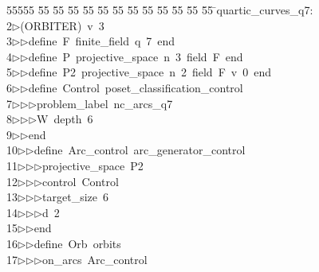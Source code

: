 %
%
\begin{tabbing}
55555 \= 55 \= 55 \= 55 \= 55 \= 55 \= 55 \= 55 \= 55 \= 55 \= 55 \= 55 \= 55 \= \>quartic\_curves\_q7:\\[0pt]
2\>$\triangleright$\>(ORBITER)\ v\ 3\ \\[0pt]
3\>$\triangleright$\>$\triangleright$\>define\ F\ finite\_field\ q\ 7\ end\ \\[0pt]
4\>$\triangleright$\>$\triangleright$\>define\ P\ projective\_space\ n\ 3\ field\ F\ end\ \\[0pt]
5\>$\triangleright$\>$\triangleright$\>define\ P2\ projective\_space\ n\ 2\ field\ F\ v\ 0\ end\ \\[0pt]
6\>$\triangleright$\>$\triangleright$\>define\ Control\ poset\_classification\_control\ \\[0pt]
7\>$\triangleright$\>$\triangleright$\>$\triangleright$\>problem\_label\ nc\_arcs\_q7\ \\[0pt]
8\>$\triangleright$\>$\triangleright$\>$\triangleright$\>W\ depth\ 6\ \\[0pt]
9\>$\triangleright$\>$\triangleright$\>end\ \\[0pt]
10\>$\triangleright$\>$\triangleright$\>define\ Arc\_control\ arc\_generator\_control\ \\[0pt]
11\>$\triangleright$\>$\triangleright$\>$\triangleright$\>projective\_space\ P2\ \\[0pt]
12\>$\triangleright$\>$\triangleright$\>$\triangleright$\>control\ Control\ \\[0pt]
13\>$\triangleright$\>$\triangleright$\>$\triangleright$\>target\_size\ 6\ \\[0pt]
14\>$\triangleright$\>$\triangleright$\>$\triangleright$\>d\ 2\ \\[0pt]
15\>$\triangleright$\>$\triangleright$\>end\ \\[0pt]
16\>$\triangleright$\>$\triangleright$\>define\ Orb\ orbits\ \\[0pt]
17\>$\triangleright$\>$\triangleright$\>$\triangleright$\>on\_arcs\ Arc\_control\ \\[0pt]

\end{tabbing}

